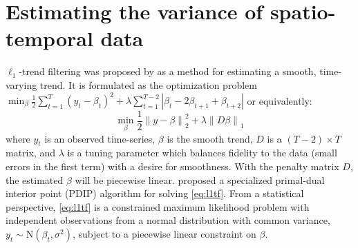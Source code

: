 \documentclass{article}
\newcommand{\norm}[1]{\left\lVert #1 \right\rVert}
\begin{document}
\section{Estimating the variance of spatio-temporal data}
\label{sec:ell_1-trend-filt}


$\ell_1$-trend filtering was proposed by \citep{KimKoh2009} as a
method for estimating a smooth, time-varying trend. It is formulated
as the optimization problem 
$
\min_{\beta} \frac{1}{2} \sum_{t=1}^{T} (y_t-\beta_t)^2+\lambda
\sum_{t=1}^{T-2} \left|\beta_t-2\beta_{t+1}+\beta_{t+2}\right| 
$
or equivalently:
\begin{equation}
\min_{\beta} \frac{1}{2} \norm{ y-\beta }_2^2+\lambda \norm{ D\beta}_1
\label{eq:l1tf}
\end{equation}
 where $y_t$ is an observed time-series, $\beta$ is the smooth trend,
 $D$ is a $(T-2)\times T$ matrix, and $\lambda$ is a tuning parameter
 which balances fidelity to the data (small errors in the first term)
 with a desire for smoothness.  
With the penalty matrix $D$, the estimated $\beta$ will be piecewise
linear. \citep{KimKoh2009} proposed a specialized primal-dual
interior point (PDIP) algorithm for solving \eqref{eq:l1tf}. From a
statistical perspective, \eqref{eq:l1tf} is a constrained maximum
likelihood problem with independent observations from a normal
distribution with common variance, $y_t \sim \mbox{N}(\beta_t,
\sigma^2)$, subject to a piecewise linear constraint on $\beta$. 
\end{document}

